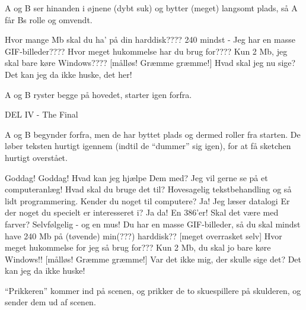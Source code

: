 \documentclass[a4paper,11pt]{article}
\begin{document}
\begin{sketch}
\scene      A og B ser hinanden i øjnene (dybt suk) og bytter (meget)
      langsomt plads, så A får Bs rolle og omvendt.

        Hvor mange Mb skal du ha' på din harddisk????
        240 mindst - Jeg har en masse GIF-billeder????
        Hvor meget hukommelse har du brug for????
        Kun 2 Mb, jeg skal bare køre Windows????
[målløs! Græmme græmme!]  Hvad skal jeg nu sige?
        Det kan jeg da ikke huske, det her!

\scene      A og B ryster begge på hovedet, starter igen forfra.

\scene
DEL IV - The Final

      A og B begynder forfra, men de har byttet plads og dermed
roller fra starten. De løber teksten hurtigt igennem (indtil de
``dummer'' sig igen), for at få sketchen hurtigt overstået. 

  Goddag!  
  Goddag! Hvad kan jeg hjælpe Dem med?
  Jeg vil gerne se på et computeranlæg!  
  Hvad skal du bruge det til?  
  Hovesagelig tekstbehandling og så lidt
            programmering.
        Kender du noget til computere?
        Ja! Jeg læser datalogi
        Er der noget du specielt er interesseret i?
        Ja da! En 386'er!
        Skal det være med farver?
        Selvfølgelig - og en mus!
        Du har en masse GIF-billeder, så du skal mindst
            have 240 Mb på (tøvende) min(???) harddisk??
[meget overrasket selv]        Hvor meget hukommelse for jeg så brug for???
        Kun 2 Mb, du skal jo bare køre Windows!!
[målløs! Græmme græmme!]        Var det ikke mig, der
            skulle sige det?
        Det kan jeg da ikke huske!

\scene      ``Prikkeren'' kommer ind på scenen, og prikker de to
      skuespillere på skulderen, og sender dem ud af scenen.
\end{sketch}
\end{document}
